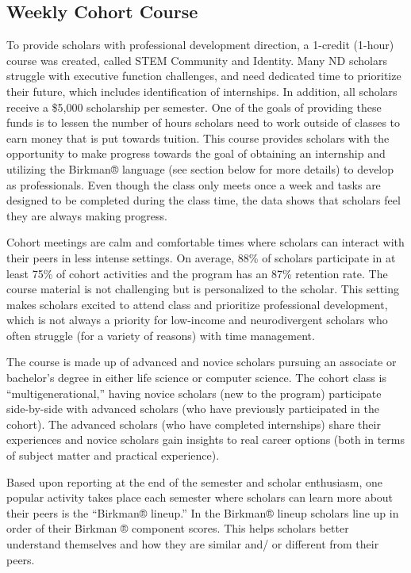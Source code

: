 \documentclass[11.5pt]{sig-alternate}
\begin{document}
\begin{large}
\subsection*{Weekly Cohort Course}

To provide scholars with professional development direction, a 1-credit (1-hour) course was created, called STEM Community and Identity. Many ND scholars struggle with executive function challenges, and need dedicated time to prioritize their future, which includes identification of internships. In addition, all scholars receive a \$5,000 scholarship per semester. One of the goals of providing these funds is to lessen the number of hours scholars need to work outside of classes to earn money that is put towards tuition. This course provides scholars with the opportunity to make progress towards the goal of obtaining an internship and utilizing the Birkman® language (see section below for more details) to develop as professionals. Even though the class only meets once a week and tasks are designed to be completed during the class time, the data shows that scholars feel they are always making progress. 

Cohort meetings are calm and comfortable times where scholars can interact with their peers in less intense settings. On average, 88\% of scholars participate in at least 75\% of cohort activities and the program has an 87\% retention rate. The course material is not challenging but is personalized to the scholar. This setting makes scholars excited to attend class and prioritize professional development, which is not always a priority for low-income and neurodivergent scholars who often struggle (for a variety of reasons) with time management.

The course is made up of advanced and novice scholars pursuing an associate or bachelor’s degree in either life science or computer science. The cohort class is “multigenerational,” having novice scholars (new to the program) participate side-by-side with advanced scholars (who have previously participated in the cohort). The advanced scholars (who have completed internships) share their experiences and novice scholars gain insights to real career options (both in terms of subject matter and practical experience). 

Based upon reporting at the end of the semester and scholar enthusiasm, one popular activity takes place each semester where scholars can learn more about their peers is the “Birkman® lineup.” In the Birkman® lineup scholars line up in order of their Birkman ® component scores. This helps scholars better understand themselves and how they are similar and/ or different from their peers.


\end{large}
\end{document}
